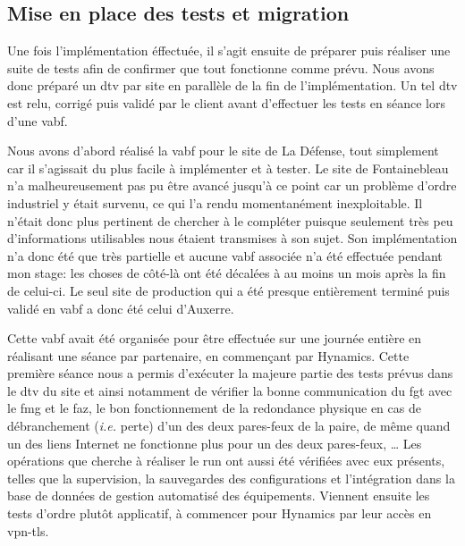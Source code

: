 \documentclass[12pt, oneside, a4paper, titlepage]{report}
\begin{document}
\FloatBarrier{}
\subsection{Mise en place des tests et migration}%
\label{sub:mission::main::tests}

Une fois l'implémentation éffectuée, il s'agit ensuite de préparer puis réaliser
une suite de tests afin de confirmer que tout fonctionne comme prévu. Nous avons
donc préparé un \acrfull{dtv} par site en parallèle de la fin de
l'implémentation. Un tel \gls{dtv} est relu, corrigé puis validé par le client
avant d'effectuer les tests en séance lors d'une \acrfull{vabf}.

Nous avons d'abord réalisé la \gls{vabf} pour le site de La Défense, tout
simplement car il s'agissait du plus facile à implémenter et à tester. Le site
de Fontainebleau n'a malheureusement pas pu être avancé jusqu'à ce point car un
problème d'ordre industriel y était survenu, ce qui l'a rendu momentanément
inexploitable. Il n'était donc plus pertinent de chercher à le compléter puisque
seulement très peu d'informations utilisables nous étaient transmises à son
sujet. Son implémentation n'a donc été que très partielle et aucune \gls{vabf}
associée n'a été effectuée pendant mon stage: les choses de côté-là ont été
décalées à au moins un mois après la fin de celui-ci. Le seul site de production
qui a été presque entièrement terminé puis validé en \gls{vabf} a donc été celui
d'Auxerre.

Cette \gls{vabf} avait été organisée pour être effectuée sur une journée entière
en réalisant une séance par partenaire, en commençant par Hynamics. Cette
première séance nous a permis d'exécuter la majeure partie des tests prévus dans
le \gls{dtv} du site et ainsi notamment de vérifier la bonne communication du
\acrlong{fgt} avec le \acrlong{fmg} et le \acrlong{faz}, le bon fonctionnement
de la redondance physique en cas de débranchement (\textit{i.e.} perte) d'un des
deux pares-feux de la paire, de même quand un des liens Internet ne fonctionne
plus pour un des deux pares-feux, \ldots{} Les opérations que cherche à réaliser
le \gls{run} ont aussi été vérifiées avec eux présents, telles que la
supervision, la sauvegardes des configurations et l'intégration dans la base de
données de gestion automatisé des équipements. Viennent ensuite les tests
d'ordre plutôt applicatif, à commencer pour Hynamics par leur accès en
\gls{vpn-tls}.
\end{document}
